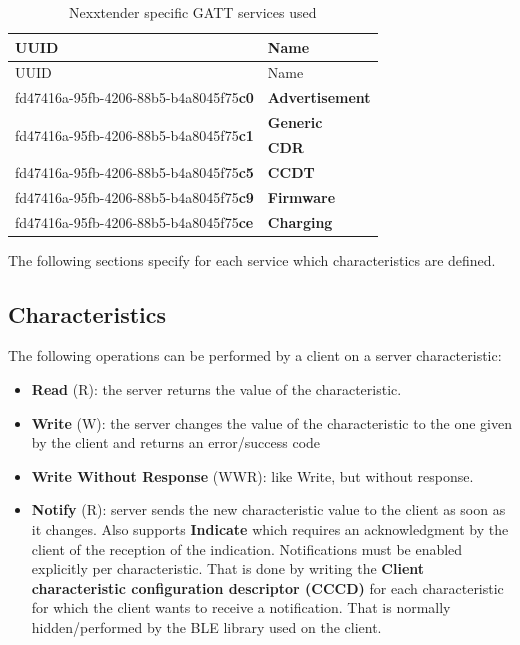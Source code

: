 \documentclass[a4paper]{article}
\begin{document}
\begingroup
\renewcommand*{\arraystretch}{1.4} %
\begin{longtable}[]{@{}ll@{}}
	\caption{Nexxtender specific GATT services used}
	\label{table.74}
	\tabularnewline
	\toprule\noalign{}
	UUID                                                           & Name              \\
	\midrule\noalign{}
	\endfirsthead
	\toprule\noalign{}
	UUID                                                           & Name              \\
	\midrule\noalign{}
	\endhead
	\bottomrule\noalign{}
	\endlastfoot
	fd47416a-95fb-4206-88b5-b4a8045f75\textbf{c0}                  &                   
	\textbf{Advertisement} \\
	\multirow{2}{*}{fd47416a-95fb-4206-88b5-b4a8045f75\textbf{c1}} &                   
	\textbf{Generic} \\
	                                                               & \textbf{CDR}      \\
	fd47416a-95fb-4206-88b5-b4a8045f75\textbf{c5}                  & \textbf{CCDT}     \\
	fd47416a-95fb-4206-88b5-b4a8045f75\textbf{c9}                  & \textbf{Firmware} \\
	fd47416a-95fb-4206-88b5-b4a8045f75\textbf{ce}                  & \textbf{Charging} \\
\end{longtable}
\endgroup
The following sections specify for each service which characteristics are defined.

\subsection{Characteristics}
\label{characteristics}

The following operations can be performed by a client on a server characteristic:

\begin{itemize}
	
	\item
	      \textbf{Read} (R): the server returns the value of the characteristic.
	\item
	      \textbf{Write} (W): the server changes the value of the characteristic
	      to the one given by the client and returns an error/success
	      code\textquotesingle{}
	\item
	      \textbf{Write Without Response} (WWR): like Write, but without response.
	\item
	      \textbf{Notify} (R): server sends the new characteristic value to the
	      client as soon as it changes. 
	      Also supports \textbf{Indicate} which requires an acknowledgment by the 
	      client of the reception of the indication. 
	      Notifications must be enabled explicitly per characteristic. 
	      That is done by writing the \textbf{Client characteristic configuration descriptor (CCCD)} 
	      for each characteristic for which the client wants to receive a notification.
	      That is normally hidden/performed by the BLE library used on the client.
\end{itemize}
\end{document}
